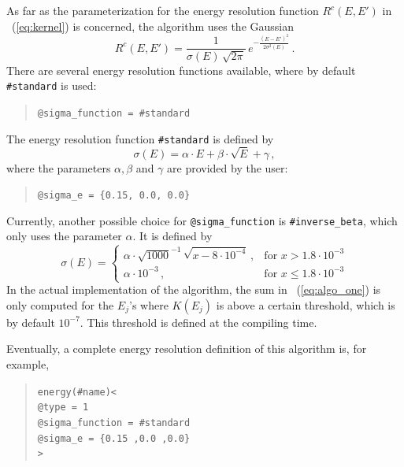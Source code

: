 %
%
As far as the parameterization for the energy resolution function 
$R^c(E,E')$ in \eq~(\ref{eq:kernel}) is concerned, the algorithm uses
the Gaussian
\begin{equation}
R^c(E,E')=\frac{1}{\sigma(E)\,\sqrt{2\pi}}\,e^{-\frac{(E-E')^2}{2\sigma^2(E)}} \, .
\end{equation} 
%
%
There are several energy resolution functions available, where by default
{\tt \#standard} is used:
\begin{quote}
{\tt \tb @sigma\_function = \#standard} 
\end{quote}
%
%
The energy resolution function {\tt \#standard} is defined by
\begin{equation}
\label{eq:sigma_e}
\sigma(E)=\alpha\cdot E + \beta \cdot \sqrt{E} +\gamma\, ,
\end{equation}
where the parameters $\alpha, \beta$ and $\gamma$ are provided by the user:
\begin{quote}
{\tt \tb @sigma\_e = \{0.15, 0.0, 0.0\}}
\end{quote}
Currently, another possible choice for {\tt @sigma\_function} is {\tt \#inverse\_beta},
%
%
which only uses the parameter $\alpha$. It is defined by
\begin{equation}
\sigma(E)= \left\{\begin{array}{cl}
 \alpha \cdot \sqrt{1000}^{-1}\,\sqrt{x-8\cdot10^{-4}}\,,&\mathrm{for}\,\, 
x>1.8\cdot10^{-3}\\
\alpha\cdot10^{-3} \,,&\mathrm{for}\,\, x \leq 1.8\cdot10^{-3}
\end{array} \right.
\end{equation}
In the actual implementation of the algorithm,  the sum in \eq~(\ref{eq:algo_one}) is only computed for the $E_j$'s where $K(E_j)$ 
is above a certain threshold, which is by default $10^{-7}$. 
This threshold is defined at the compiling time. 

Eventually,  a complete energy resolution definition of this 
algorithm is, for example,
\begin{quote}
{\tt energy(\#name)<\\
\tb @type = 1\\
\tb @sigma\_function = \#standard\\
\tb @sigma\_e = \{0.15 ,0.0 ,0.0\}\\
>
}
\end{quote}

